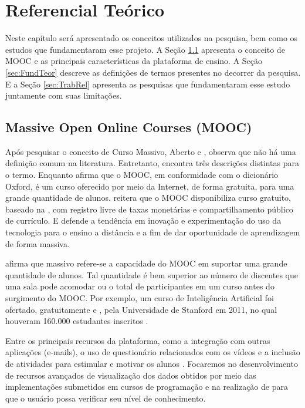 \chapter{Referencial Teórico}
\label{chap:Ref}
	Neste capítulo será apresentado os conceitos utilizados na pesquisa, bem como
	os estudos que fundamentaram esse projeto. A Seção \ref{sec:Mooc} apresenta
	o conceito de MOOC e as principais características da plataforma de ensino. A
	Seção \ref{sec:FundTeor} descreve as definições de termos presentes no decorrer
	da pesquisa. E a Seção \ref{sec:TrabRel} apresenta as pesquisas que fundamentaram
	esse estudo juntamente com suas limitações.

	\section{Massive Open Online Courses (MOOC)}
	\label{sec:Mooc}
		Após pesquisar o conceito de Curso Massivo, Aberto e ,
		 observa que não há uma definição comum na
		literatura. Entretanto, encontra três descrições distintas para o termo.
		Enquanto  afirma que o MOOC, em conformidade com
		o dicionário Oxford, é um curso oferecido por meio da Internet, de forma
		gratuita, para uma grande quantidade de alunos. 
		reitera que o MOOC disponibiliza curso gratuito, baseado na ,
		com registro livre de taxas monetárias e compartilhamento público de
		currículo. E  defende a tendência em inovação e
		experimentação do uso da tecnologia para o ensino a distância e
		 a fim de dar oportunidade de aprendizagem de forma massiva.
		
		 afirma que massivo refere-se a capacidade do MOOC em
		suportar uma grande quantidade de alunos. Tal quantidade é bem superior
		ao número de discentes que uma sala pode acomodar ou o total de
		participantes em um curso  antes do surgimento do MOOC.
		Por exemplo, um curso de Inteligência Artificial foi ofertado, gratuitamente e
		, pela Universidade de Stanford em 2011, no qual houveram
		160.000 estudantes inscritos \cite{rodriguez2012}.
		
		Entre os principais recursos da plataforma, como a integração com outras
		aplicações (e-mails), o uso de questionário relacionados com os vídeos e a
		inclusão de atividades para estimular e motivar os alunos \cite{fassbinder2014}.
		Focaremos no desenvolvimento de recursos avançados de visualização dos dados
		obtidos por meio das implementações submetidos em cursos de programação e
		na realização de  para que o usuário possa verificar seu nível
		de conhecimento.

